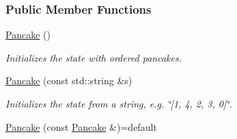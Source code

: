 \subsubsection*{Public Member Functions}
\begin{DoxyCompactItemize}
\item 
\hyperlink{structdomain_1_1pancake_1_1Pancake_ac2575e81e762d460e99100d10008fcc8}{Pancake} ()\hypertarget{structdomain_1_1pancake_1_1Pancake_ac2575e81e762d460e99100d10008fcc8}{}\label{structdomain_1_1pancake_1_1Pancake_ac2575e81e762d460e99100d10008fcc8}

\begin{DoxyCompactList}\small\item\em Initializes the state with ordered pancakes. \end{DoxyCompactList}\item 
\hyperlink{structdomain_1_1pancake_1_1Pancake_a1e80688a11629bc3628a116723726692}{Pancake} (const std\+::string \&s)
\begin{DoxyCompactList}\small\item\em Initializes the state from a string, e.\+g. \char`\"{}\mbox{[}1, 4, 2, 3, 0\mbox{]}\char`\"{}. \end{DoxyCompactList}\item 
\hyperlink{structdomain_1_1pancake_1_1Pancake_a9e8c50925c8c328199e9f4468976b1dd}{Pancake} (const \hyperlink{structdomain_1_1pancake_1_1Pancake}{Pancake} \&)=default\hypertarget{structdomain_1_1pancake_1_1Pancake_a9e8c50925c8c328199e9f4468976b1dd}{}\label{structdomain_1_1pancake_1_1Pancake_a9e8c50925c8c328199e9f4468976b1dd}


\end{DoxyCompactItemize}
